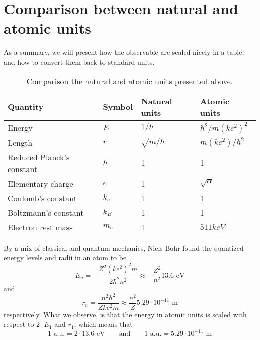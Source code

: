 \section{Comparison between natural and atomic units}
As a summary, we will present how the observable are scaled nicely in a table, and how to convert them back to standard units.
\begin{table} [H]
	\caption{Comparison the natural and atomic units presented above.  \vspace{2mm}}
	\begin{tabularx}{\textwidth}{X|XXX} \hline\hline
		\label{tab:energies2P2D}
		Quantity & Symbol & Natural units & Atomic units \\ \hline
		Energy & $E$ & $1/\hbar$ & $\hbar^2/m(ke^2)^2$\\ 
		Length & $r$ & $\sqrt{m/\hbar}$ & $m(ke^2)/\hbar^2$\\
		Reduced Planck's constant & $\hbar$ & 1 & 1 \\
		Elementary charge & $e$ & 1 & $\sqrt{\alpha}$ \\
		Coulomb's constant & $k_e$ & 1 & 1 \\
		Boltzmann's constant & $k_B$ & 1 & 1 \\
		Electron rest mass & $m_e$ & 1 & $511 keV$ \\ \hline\hline
	\end{tabularx}
\end{table}

By a mix of classical and quantum mechanics, Niels Bohr found the quantized energy levels and radii in an atom to be
\begin{equation}
E_n=-\frac{Z^2(ke^2)^2m}{2\hbar^2n^2}\approx-\frac{Z^2}{n^2}13.6\text{ eV}
\end{equation}
and
\begin{equation}
r_n=\frac{n^2\hbar^2}{Zke^2m}\approx\frac{n^2}{Z}5.29\cdot10^{-11}\text{ m}
\end{equation}
respectively. What we observe, is that the energy in atomic units is scaled with respect to $2\cdot E_1$ and $r_1$, which means that
\begin{equation}
1\text{ a.u.} = 2\cdot13.6\text{ eV}\quad\quad\text{and}\quad\quad 1 \text{ a.u.} = 5.29\cdot10^{-11}\text{ m}
\end{equation}